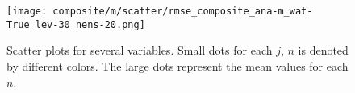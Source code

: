 \documentclass[a4paper, 12pt]{article}
\begin{document}
\begin{figure}[ht]
\noindent \centering
\texttt{[image: composite/m/scatter/rmse\_composite\_ana-m\_wat-True\_lev-30\_nens-20.png]}\\
\caption{Scatter plots for several variables. Small dots for each $j$, $n$ is denoted by different colors. The large dots represent the mean values for each $n$.} \label{fig:Fig11}
\end{figure}

% 
% 
% 
% 
\end{document}
